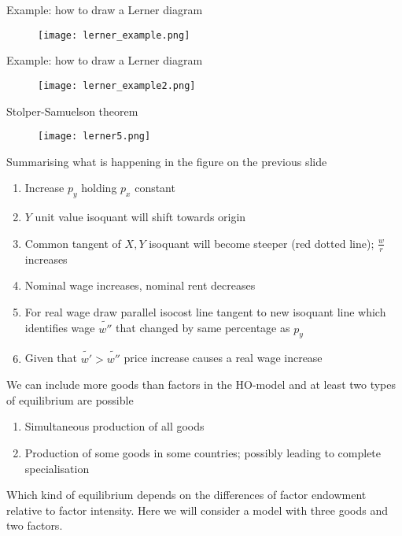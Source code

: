 \documentclass{beamer}
\begin{document}
\begin{frame}{Example: how to draw a Lerner diagram}
  \begin{figure}
    \texttt{[image: lerner\_example.png]}
  \end{figure}
\end{frame}

\begin{frame}{Example: how to draw a Lerner diagram}
  \begin{figure}
    \texttt{[image: lerner\_example2.png]}
  \end{figure}
\end{frame}

\begin{frame}{Stolper-Samuelson theorem}
  \begin{figure}
    \texttt{[image: lerner5.png]}
  \end{figure}
\end{frame}

\begin{frame}
 Summarising what is happening in the figure on the previous slide
 \begin{enumerate}
   \item Increase $p_y$ holding $p_x$ constant
   \item $Y$ unit value isoquant will shift towards origin
   \item Common tangent of $X,Y$ isoquant will become steeper (red dotted line); $\frac{w}{r}$ increases
   \item Nominal wage increases, nominal rent decreases
   \item For real wage draw parallel isocost line tangent to new isoquant line which identifies wage $\widetilde{w''}$ that changed by same percentage as $p_y$
   \item Given that $\widetilde{w'}>\widetilde{w''}$ price increase causes a real wage increase
 \end{enumerate}
\end{frame}

\begin{frame}
 We can include more goods than factors in the HO-model and at least two types of equilibrium are possible
 \begin{enumerate}
   \item Simultaneous production of all goods
   \item Production of some goods in some countries; possibly leading to complete specialisation
 \end{enumerate}
 \medskip
 Which kind of equilibrium depends on the differences of factor endowment relative to factor intensity. 
 Here we will consider a model with three goods and two factors.
\end{frame}
\end{document}
